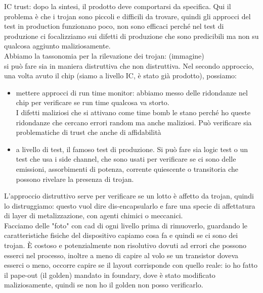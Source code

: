 \documentclass[oneside, 12pt]{extbook}
\begin{document}
IC trust: dopo la sintesi, il prodotto deve comportarsi da specifica. Qui il problema è che i trojan sono piccoli e difficili da trovare, quindi gli approcci del test in production funzionano poco, non sono efficaci perché nel test di produzione ci focalizziamo sui difetti di produzione che sono predicibili ma non su qualcosa aggiunto maliziosamente.\\Abbiamo la tassonomia per la rilevazione dei trojan: (immagine)\\si può fare sia in maniera distruttiva che non distruttiva. Nel secondo approccio, una volta avuto il chip (siamo a livello IC, è stato già prodotto), possiamo:
\begin{itemize}
	\item mettere approcci di run time monitor: abbiamo messo delle ridondanze nel chip per verificare se run time qualcosa va storto.\\I difetti maliziosi che si attivano come time bomb le stano perché ho queste ridondanze che cercano errori random ma anche maliziosi. Può verificare sia problematiche di trust che anche di affidabilità
	\item a livello di test, il famoso test di produzione. Si può fare sia logic test o un test che usa i side channel, che sono usati per verificare se ci sono delle emissioni, assorbimenti di potenza, corrente quiescente o transitoria che possono rivelare la presenza di trojan.
\end{itemize}
L'approccio distruttivo serve per verificare se un lotto è affetto da trojan, quindi lo distruggiamo: questo vuol dire dis-encapsularlo e fare una specie di affettatura di layer di metalizzazione, con agenti chimici o meccanici.\\Facciamo delle "foto" con cad di ogni livello prima di rimuoverlo, guardando le caratteristiche fisiche del dispositivo capiamo cosa fa e quindi se ci sono dei trojan. È costoso e potenzialmente non risolutivo dovuti ad errori che possono esserci nel processo, inoltre a meno di capire al volo se un transistor doveva esserci o meno, occorre capire se il layout corrisponde con quello reale: io ho fatto il pape-out (il golden) mandato in foundary, dove è stato modificato maliziosamente, quindi se non ho il golden non posso verificarlo.\\
\end{document}
